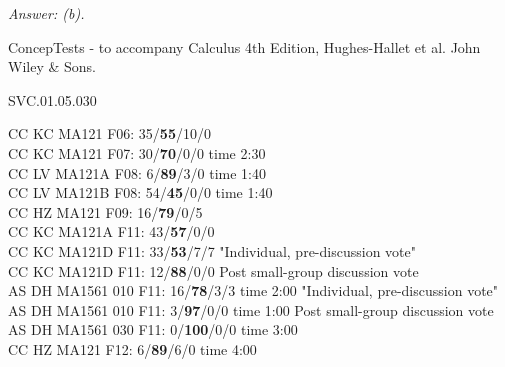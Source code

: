 {\it Answer: (b).} 

\medskip
\medskip
ConcepTests - to accompany Calculus 4th Edition, Hughes-Hallet et al. John Wiley \& Sons.

SVC.01.05.030

CC KC MA121 F06: 35/{\bf 55}/10/0\\
CC KC MA121 F07: 30/{\bf 70}/0/0 time 2:30\\
CC LV MA121A F08: 6/{\bf89}/3/0 time 1:40\\
CC LV MA121B F08: 54/{\bf45}/0/0 time 1:40\\
CC HZ MA121 F09: 16/{\bf79}/0/5  \\
CC KC MA121A F11: 43/{\bf57}/0/0  \\
CC KC MA121D F11: 33/{\bf53}/7/7 "Individual, pre-discussion vote" \\
CC KC MA121D F11: 12/{\bf88}/0/0 Post small-group discussion vote \\
AS DH MA1561 010 F11: 16/{\bf78}/3/3 time 2:00 "Individual, pre-discussion vote" \\
AS DH MA1561 010 F11: 3/{\bf97}/0/0 time 1:00 Post small-group discussion vote \\
AS DH MA1561 030 F11: 0/{\bf100}/0/0 time 3:00  \\
CC HZ MA121 F12: 6/{\bf89}/6/0 time 4:00  \\
